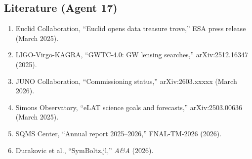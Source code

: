\documentclass[11pt,a4paper]{article}
\begin{document}
\subsection{Literature (Agent 17)}

\begin{enumerate}
\item Euclid Collaboration, ``Euclid opens data treasure trove,'' ESA press release (March 2025).
\item LIGO-Virgo-KAGRA, ``GWTC-4.0: GW lensing searches,'' arXiv:2512.16347 (2025).
\item JUNO Collaboration, ``Commissioning status,'' arXiv:2603.xxxxx (March 2026).
\item Simons Observatory, ``eLAT science goals and forecasts,'' arXiv:2503.00636 (March 2025).
\item SQMS Center, ``Annual report 2025--2026,'' FNAL-TM-2026 (2026).
\item Durakovic et al., ``SymBoltz.jl,'' \textit{A\&A} (2026).
\end{enumerate}
\end{document}
